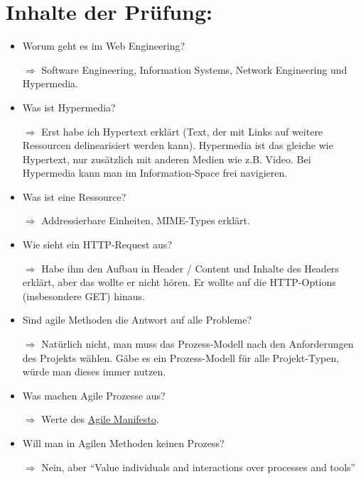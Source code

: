 \documentclass[a4paper]{article}
\begin{document}
\section*{Inhalte der Prüfung:}


    \begin{itemize}
        \item Worum geht es im Web Engineering?
        \item[$\Rightarrow$] Software Engineering, Information Systems, Network Engineering und Hypermedia.
        \item Was ist Hypermedia?
        \item[$\Rightarrow$] Erst habe ich Hypertext erklärt (Text, der mit Links auf weitere Ressourcen delinearisiert werden kann).
             Hypermedia ist das gleiche wie Hypertext, nur zusätzlich mit anderen Medien wie z.B. Video.
             Bei Hypermedia kann man im Information-Space frei navigieren.
        \item Was ist eine Ressource?
        \item[$\Rightarrow$] Addressierbare Einheiten, MIME-Types erklärt.
        \item Wie sieht ein HTTP-Request aus?
        \item[$\Rightarrow$] Habe ihm den Aufbau in Header / Content und Inhalte des
              Headers erklärt, aber das wollte er nicht hören. Er
              wollte auf die HTTP-Options (insbesondere GET) hinaus.
        \item Sind agile Methoden die Antwort auf alle Probleme?
        \item[$\Rightarrow$] Natürlich nicht, man muss das Prozess-Modell
              nach den Anforderungen des Projekts wählen. Gäbe es ein
              Prozess-Modell für alle Projekt-Typen, würde man dieses
              immer nutzen.
        \item Was machen Agile Prozesse aus?
        \item[$\Rightarrow$] Werte des \href{http://agilemanifesto.org/}{Agile Manifesto}.
        \item Will man in Agilen Methoden keinen Prozess?
        \item[$\Rightarrow$] Nein, aber "`Value individuals and interactions over processes and tools"'
    \end{itemize}
\end{document}
